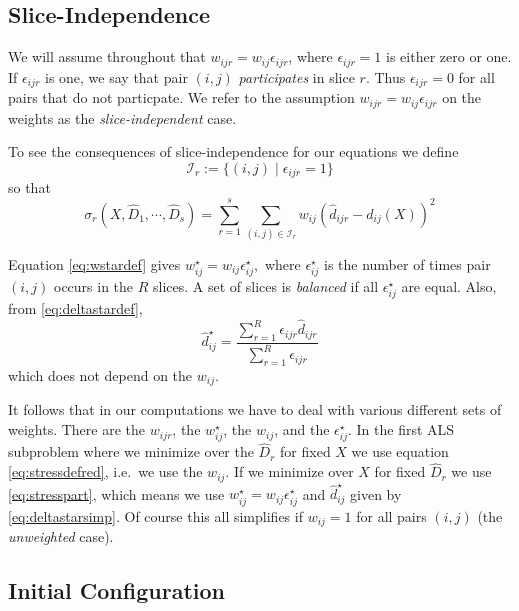 \documentclass[
  12pt,
]{article}
\begin{document}
\subsection{Slice-Independence}\label{slice-independence}

We will assume throughout that \(w_{ijr}=w_{ij}\epsilon_{ijr}\), where
\(\epsilon_{ijr}=1\) is either zero or one. If \(\epsilon_{ijr}\) is one, we say that pair \((i,j)\) \emph{participates} in slice \(r\). Thus \(\epsilon_{ijr}=0\) for all pairs that do not particpate. We refer to the assumption \(w_{ijr}=w_{ij}\epsilon_{ijr}\) on the weights as the \emph{slice-independent} case.

To see the consequences of slice-independence for our equations
we define
\begin{equation}
\mathcal{I}_r:=\{(i, j)\mid \epsilon_{ijr}= 1\}
\label{eq:irdef}
\end{equation}
so that
\begin{equation}
\sigma_r(X,\hat D_1,\cdots,\hat D_s)=\sum_{r=1}^s\sum_{(i,j)\in\mathcal{I}_r} w_{ij}(\hat d_{ijr}-d_{ij}(X))^2
\label{eq:stressdefred}
\end{equation}

Equation \eqref{eq:wstardef} gives \(w_{ij}^\star=w_{ij}\epsilon_{ij}^\star,\)
where \(\epsilon_{ij}^\star\) is the number of times pair \((i,j)\) occurs in
the \(R\) slices. A set of slices is \emph{balanced} if all \(\epsilon_{ij}^\star\) are equal. Also, from \eqref{eq:deltastardef},
\begin{equation}
\hat d_{ij}^\star=\frac{\sum_{r=1}^R \epsilon_{ijr}\hat d_{ijr}}{\sum_{r=1}^R \epsilon_{ijr}}
\label{eq:deltastarsimp}
\end{equation}
which does not depend on the \(w_{ij}\).

It follows that in our computations we have to deal with various
different sets of weights. There are the \(w_{ijr}\), the \(w_{ij}^\star\),
the \(w_{ij}\), and the \(\epsilon_{ij}^\star\). In the first ALS subproblem
where we minimize over the \(\hat D_r\) for fixed \(X\) we use
equation \eqref{eq:stressdefred}, i.e.~we use the \(w_{ij}\). If we minimize over \(X\) for fixed \(\hat D_r\) we use \eqref{eq:stresspart}, which means we
use \(w_{ij}^\star=w_{ij}\epsilon_{ij}^\star\) and \(\hat d_{ij}^\star\)
given by \eqref{eq:deltastarsimp}. Of course this all simplifies
if \(w_{ij}=1\) for all pairs \((i,j)\) (the \emph{unweighted} case).

\subsection{Initial Configuration}\label{initial-configuration}
\end{document}
